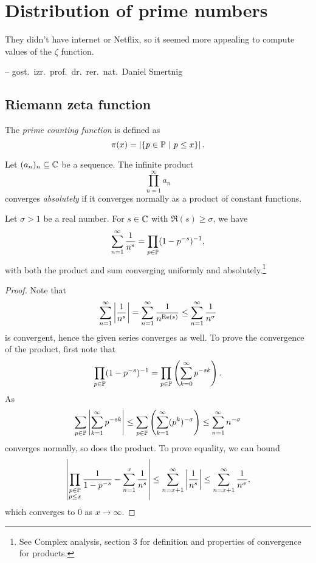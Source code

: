 \section{Distribution of prime numbers}

\epigraph{They didn't have internet or Netflix, so it seemed more
appealing to compute values of the $\zeta$ function.}
{-- gost.~izr.~prof.~dr.~rer.~nat.~Daniel Smertnig}

\subsection{Riemann zeta function}


\begin{definicija}
The \emph{prime counting function}
is defined as
\[
\pi(x) = \abs{\setb{p \in \P}{p \leq x}}.
\]
\end{definicija}

\begin{definicija}
Let $(a_n)_n \subseteq \C$ be a sequence. The infinite product
\[
\prod_{n=1}^\infty a_n
\]
converges \emph{absolutely} if it
converges normally as a product of constant functions.
\end{definicija}

\begin{izrek}
Let $\sigma > 1$ be a real number. For $s \in \C$ with
$\Re(s) \geq \sigma$, we have
\[
\sum_{n=1}^\infty \frac{1}{n^s} =
\prod_{p \in \P} (1 - p^{-s})^{-1},
\]
with both the product and sum converging uniformly and
absolutely.\footnote{See Complex analysis, section 3 for definition
and properties of convergence for products.}
\end{izrek}

\begin{proof}
Note that
\[
\sum_{n=1}^\infty \abs{\frac{1}{n^s}} =
\sum_{n=1}^\infty \frac{1}{n^{\Re(s)}} \leq
\sum_{n=1}^\infty \frac{1}{n^\sigma}
\]
is convergent, hence the given series converges as well. To prove
the convergence of the product, first note that
\[
\prod_{p \in \P} (1-p^{-s})^{-1} =
\prod_{p \in \P} \br{\sum_{k=0}^\infty p^{-sk}}.
\]
As
\[
\sum_{p \in \P} \abs{\sum_{k=1}^\infty p^{-sk}} \leq
\sum_{p \in \P} \br{\sum_{k=1}^\infty (p^k)^{-\sigma}} \leq
\sum_{n=1}^\infty n^{-\sigma}
\]
converges normally, so does the product. To prove equality, we can
bound
\[
\abs{\prod_{\substack{p \in \P \\ p \leq x}}
\frac{1}{1 - p^{-s}} - \sum_{n=1}^x \frac{1}{n^s}} \leq
\sum_{n=x+1}^\infty \abs{\frac{1}{n^s}} \leq
\sum_{n=x+1}^\infty \frac{1}{n^\sigma},
\]
which converges to $0$ as $x \to \infty$.
\end{proof}

